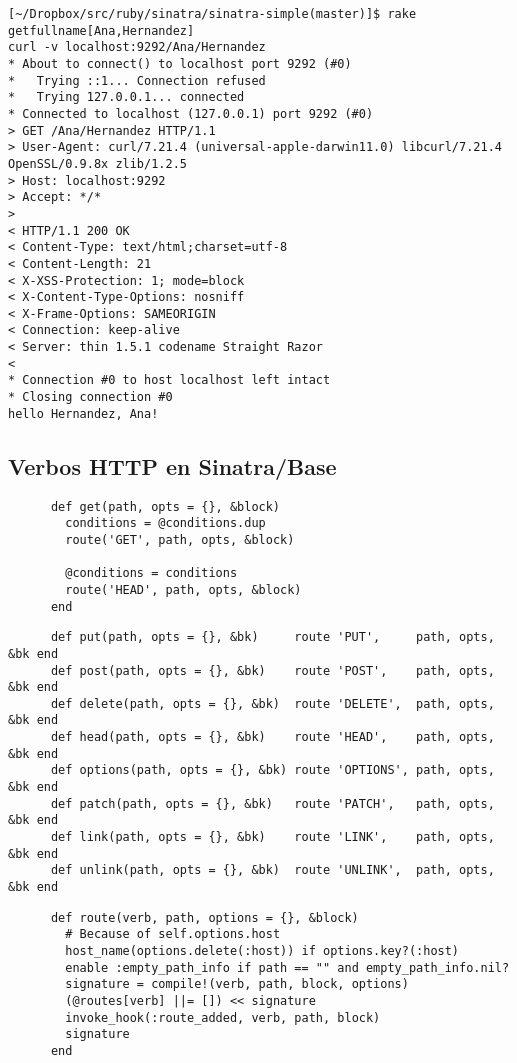 \begin{verbatim}
[~/Dropbox/src/ruby/sinatra/sinatra-simple(master)]$ rake getfullname[Ana,Hernandez]
curl -v localhost:9292/Ana/Hernandez
* About to connect() to localhost port 9292 (#0)
*   Trying ::1... Connection refused
*   Trying 127.0.0.1... connected
* Connected to localhost (127.0.0.1) port 9292 (#0)
> GET /Ana/Hernandez HTTP/1.1
> User-Agent: curl/7.21.4 (universal-apple-darwin11.0) libcurl/7.21.4 OpenSSL/0.9.8x zlib/1.2.5
> Host: localhost:9292
> Accept: */*
> 
< HTTP/1.1 200 OK
< Content-Type: text/html;charset=utf-8
< Content-Length: 21
< X-XSS-Protection: 1; mode=block
< X-Content-Type-Options: nosniff
< X-Frame-Options: SAMEORIGIN
< Connection: keep-alive
< Server: thin 1.5.1 codename Straight Razor
< 
* Connection #0 to host localhost left intact
* Closing connection #0
hello Hernandez, Ana!
\end{verbatim}

\subsection{Verbos HTTP en Sinatra/Base}

\begin{verbatim}
      def get(path, opts = {}, &block)
        conditions = @conditions.dup
        route('GET', path, opts, &block)

        @conditions = conditions
        route('HEAD', path, opts, &block)
      end
\end{verbatim}

\begin{verbatim}
      def put(path, opts = {}, &bk)     route 'PUT',     path, opts, &bk end
      def post(path, opts = {}, &bk)    route 'POST',    path, opts, &bk end
      def delete(path, opts = {}, &bk)  route 'DELETE',  path, opts, &bk end
      def head(path, opts = {}, &bk)    route 'HEAD',    path, opts, &bk end
      def options(path, opts = {}, &bk) route 'OPTIONS', path, opts, &bk end
      def patch(path, opts = {}, &bk)   route 'PATCH',   path, opts, &bk end
      def link(path, opts = {}, &bk)    route 'LINK',    path, opts, &bk end
      def unlink(path, opts = {}, &bk)  route 'UNLINK',  path, opts, &bk end
\end{verbatim}

\begin{verbatim}
      def route(verb, path, options = {}, &block)
        # Because of self.options.host
        host_name(options.delete(:host)) if options.key?(:host)
        enable :empty_path_info if path == "" and empty_path_info.nil?
        signature = compile!(verb, path, block, options)
        (@routes[verb] ||= []) << signature
        invoke_hook(:route_added, verb, path, block)
        signature
      end
\end{verbatim}


